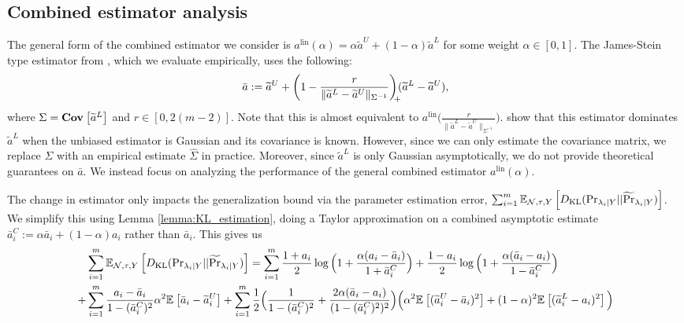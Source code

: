 \subsection{Combined estimator analysis} \label{subsec:combined}

The general form of the combined estimator we consider is $a^{\mathrm{lin}}(\alpha) = \alpha \widetilde{a}^U + (1 - \alpha) \widetilde{a}^L$ for some weight $\alpha \in [0, 1]$. The James-Stein type estimator from \cite{GreenStrawderman2001}, which we evaluate empirically, uses the following:
\begin{align}
    \bar{a} := \widetilde{a}^U + \bigg(1 - \frac{r}{\|\widetilde{a}^L - \widetilde{a}^U\|_{\Sigma^{-1}}} \bigg)_{\mathclap{+}} (\widetilde{a}^L - \widetilde{a}^U),
\end{align}
where $\Sigma = \textrm{\textbf{Cov}}_{}\left[\widetilde{a}^L\right]$ and $r \in [0, 2(m - 2)]$. Note that this is almost equivalent to $a^{\mathrm{lin}}\Big(\frac{r}{\|\widetilde{a}^L - \widetilde{a}^U\|_{\Sigma^{-1}}} \Big)$. \cite{GreenStrawderman2001} show that this estimator dominates $\widetilde{a}^L$ when the unbiased estimator is Gaussian and its covariance is known. However, since we can only estimate the covariance matrix, we replace $\Sigma$ with an empirical estimate $\hat{\Sigma}$ in practice. Moreover, since $\widetilde{a}^L$ is only Gaussian asymptotically, we do not provide theoretical guarantees on $\bar{a}$. We instead focus on analyzing the performance of the general combined estimator $a^{\mathrm{lin}}(\alpha)$. 

The change in estimator only impacts the generalization bound via the parameter estimation error,  $\sum_{i = 1}^m \mathbb{E}_{\mathcal{N}, \tau, Y}\left[D_{\mathrm{KL}} (\mathrm{Pr}_{\lambda_i | Y} || \widetilde{\Pr}_{\lambda_i | Y} )\right]$. We simplify this using Lemma \ref{lemma:KL_estimation}, doing a Taylor approximation on a combined asymptotic estimate $\bar{a}_i^C := \alpha \bar{a}_i + (1 - \alpha) a_i$ rather than $\bar{a}_i$. This gives us
\begin{align}
     &\sum_{i = 1}^m \mathbb{E}_{\mathcal{N}, \tau, Y}\left[D_{\mathrm{KL}} (\mathrm{Pr}_{\lambda_i | Y} || \widetilde{\Pr}_{\lambda_i | Y} )\right] = \sum_{i = 1}^m \frac{1 + a_i}{2} \log \Big(1 + \frac{\alpha(a_i - \bar{a}_i)}{1 + \bar{a}_i^C} \Big) + \frac{1 - a_i}{2} \log \Big(1 + \frac{\alpha(\bar{a}_i - a_i)}{1 - \bar{a}_i^C} \Big) \\
    +& \sum_{i = 1}^m \frac{a_i - \bar{a}_i}{1 - (\bar{a}_i^C)^2} \alpha^2 \mathbb{E}_{}\left[\bar{a}_i - \widetilde{a}_i^U\right]  + \sum_{i = 1}^m \frac{1}{2} \Big( \frac{1}{1 - (\bar{a}_i^C)^2} + \frac{2\alpha (\bar{a}_i - a_i)}{(1 - (\bar{a}_i^C)^2)^2}\Big) \Big(\alpha^2 \mathbb{E}_{}\left[(\widetilde{a}_i^U - \bar{a}_i)^2\right] + (1 - \alpha)^2 \mathbb{E}_{}\left[(\widetilde{a}_i^L - a_i)^2\right] \Big)
\end{align}


